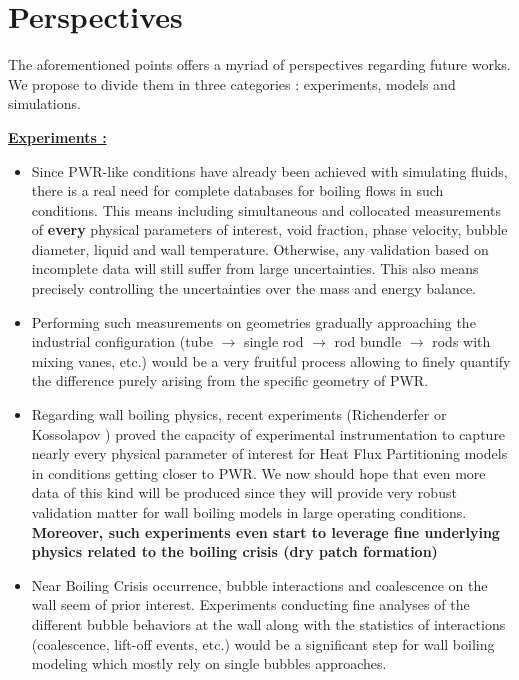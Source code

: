\section{Perspectives}

The aforementioned points offers a myriad of perspectives regarding future works. We propose to divide them in three categories : experiments, models and simulations.

\npar

\textbf{\underline{Experiments :}}

\begin{itemize}
\item Since PWR-like conditions have already been achieved with simulating fluids, there is a real need for complete databases for boiling flows in such conditions. This means including simultaneous and collocated measurements of \textbf{every} physical parameters of interest, \ie void fraction, phase velocity, bubble diameter, liquid and wall temperature. Otherwise, any validation based on incomplete data will still suffer from large uncertainties. This also means precisely controlling the uncertainties over the mass and energy balance.

\item Performing such measurements on geometries gradually approaching the industrial configuration (\eg tube $\rightarrow$ single rod $\rightarrow$ rod bundle $\rightarrow$ rods with mixing vanes, etc.) would be a very fruitful process allowing to finely quantify the difference purely arising from the specific geometry of PWR.

\item Regarding wall boiling physics, recent experiments (\eg Richenderfer \cite{richenderfer_experimental_2018} or Kossolapov \cite{kossolapov_experimental_2021}) proved the capacity of experimental instrumentation to capture nearly every physical parameter of interest for Heat Flux Partitioning models in conditions getting closer to PWR. We now should hope that even more data of this kind will be produced since they will provide very robust validation matter for wall boiling models in large operating conditions. \textbf{Moreover, such experiments even start to leverage fine underlying physics related to the boiling crisis (\eg dry patch formation)}

\item Near Boiling Crisis occurrence, bubble interactions and coalescence on the wall seem of prior interest. Experiments conducting fine analyses of the different bubble behaviors at the wall along with the statistics of interactions (coalescence, lift-off events, etc.) would be a significant step for wall boiling modeling which mostly rely on single bubbles approaches.


\end{itemize}
